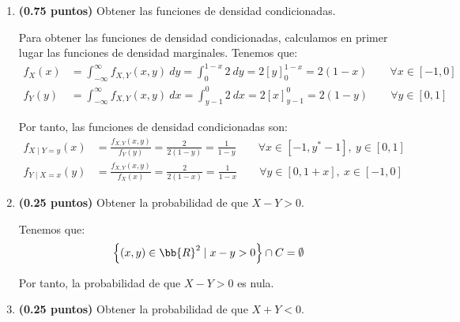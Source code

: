 \documentclass[12pt]{article}
\begin{document}
\begin{ejercicio}[5 puntos]
\begin{enumerate}
            
            \item \textbf{(0.75 puntos)} Obtener las funciones de densidad condicionadas.
            
            Para obtener las funciones de densidad condicionadas, calculamos en primer lugar las funciones de densidad marginales. Tenemos que:
            \begin{align*}
                f_X(x) &= \int_{-\infty}^{\infty} f_{X,Y}(x,y) \ dy
                = \int_{0}^{1-x} 2 \ dy = 2\left[y\right]_{0}^{1-x} = 2(1-x) \qquad \forall x\in \left[-1,0\right] \\
                f_Y(y) &= \int_{-\infty}^{\infty} f_{X,Y}(x,y) \ dx
                = \int_{y-1}^{0} 2 \ dx = 2\left[x\right]_{y-1}^{0} = 2(1-y) \qquad \forall y\in \left[0,1\right]
            \end{align*}

            Por tanto, las funciones de densidad condicionadas son:
            \begin{align*}
                f_{X\mid Y=y}(x) &= \frac{f_{X,Y}(x,y)}{f_Y(y)} = \frac{2}{2(1-y)} = \frac{1}{1-y} \qquad \forall x\in \left[-1,y^*-1\right], \ y\in \left[0,1\right] \\
                f_{Y\mid X=x}(y) &= \frac{f_{X,Y}(x,y)}{f_X(x)} = \frac{2}{2(1-x)} = \frac{1}{1-x} \qquad \forall y\in \left[0,1+x\right], \ x\in \left[-1,0\right]
            \end{align*}
            \item \textbf{(0.25 puntos)} Obtener la probabilidad de que $X-Y > 0$.
            
            Tenemos que:
            \begin{equation*}
                \left\{(x,y)\in \bb{R}^2 \mid x-y>0\right\}\cap C=\emptyset
            \end{equation*}

            Por tanto, la probabilidad de que $X-Y>0$ es nula.
            \item \textbf{(0.25 puntos)} Obtener la probabilidad de que $X+Y < 0$.
            

\end{enumerate}
\end{ejercicio}
\end{document}
